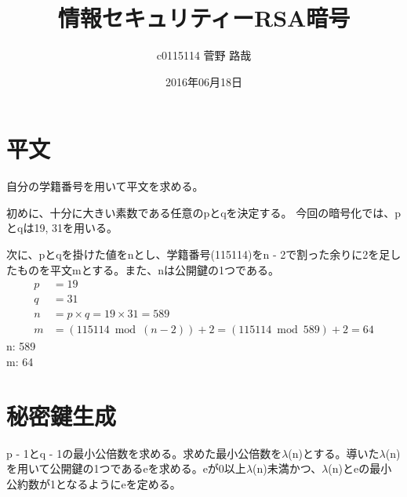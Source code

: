 \documentclass[uplatex]{jsarticle}
\title{情報セキュリティーRSA暗号}
\author{c0115114 菅野 路哉}
\date{2016年06月18日}
\begin{document}
\maketitle

\section{平文}
自分の学籍番号を用いて平文を求める。

初めに、十分に大きい素数である任意のpとqを決定する。
今回の暗号化では、pとqは19, 31を用いる。

次に、pとqを掛けた値をnとし、学籍番号(115114)をn - 2で割った余りに2を足したものを平文mとする。また、nは公開鍵の1つである。
\begin{align*}
  p&=19\\
  q&=31\\
  n&=p \times q = 19 \times 31 = 589\\
  m&=(115114 \bmod (n - 2)) + 2 = (115114 \bmod 589) + 2 = 64
\end{align*}
n: 589\\
m: 64


\section{秘密鍵生成}
p - 1とq - 1の最小公倍数を求める。求めた最小公倍数を$\lambda$(n)とする。導いた$\lambda$(n)を用いて公開鍵の1つであるeを求める。eが0以上$\lambda$(n)未満かつ、$\lambda$(n)とeの最小公約数が1となるようにeを定める。
\end{document}

